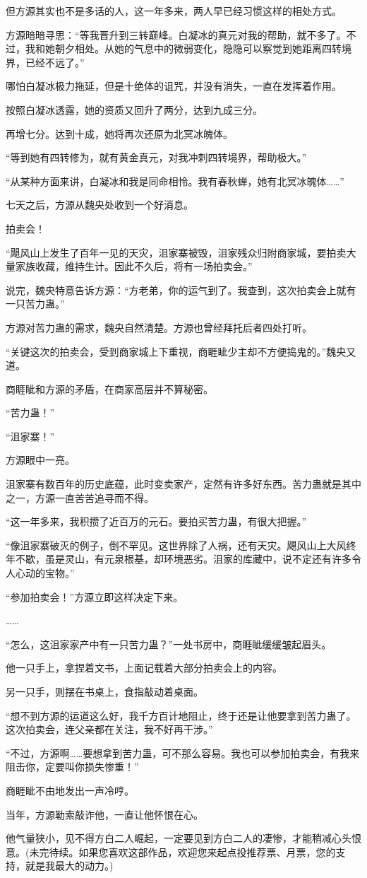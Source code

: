 \begin{this_body}
但方源其实也不是多话的人，这一年多来，两人早已经习惯这样的相处方式。

方源暗暗寻思：“等我晋升到三转巅峰。白凝冰的真元对我的帮助，就不多了。不过，我和她朝夕相处。从她的气息中的微弱变化，隐隐可以察觉到她距离四转境界，已经不远了。”

哪怕白凝冰极力拖延，但是十绝体的诅咒，并没有消失，一直在发挥着作用。

按照白凝冰透露，她的资质又回升了两分，达到九成三分。

再增七分。达到十成，她将再次还原为北冥冰魄体。

“等到她有四转修为，就有黄金真元，对我冲刺四转境界，帮助极大。”

“从某种方面来讲，白凝冰和我是同命相怜。我有春秋蝉，她有北冥冰魄体……”

七天之后，方源从魏央处收到一个好消息。

拍卖会！

“飓风山上发生了百年一见的天灾，沮家寨被毁，沮家残众归附商家城，要拍卖大量家族收藏，维持生计。因此不久后，将有一场拍卖会。”

说完，魏央特意告诉方源：“方老弟，你的运气到了。我查到，这次拍卖会上就有一只苦力蛊。”

方源对苦力蛊的需求，魏央自然清楚。方源也曾经拜托后者四处打听。

“关键这次的拍卖会，受到商家城上下重视，商睚眦少主却不方便捣鬼的。”魏央又道。

商睚眦和方源的矛盾，在商家高层并不算秘密。

“苦力蛊！”

“沮家寨！”

方源眼中一亮。

沮家寨有数百年的历史底蕴，此时变卖家产，定然有许多好东西。苦力蛊就是其中之一，方源一直苦苦追寻而不得。

“这一年多来，我积攒了近百万的元石。要拍买苦力蛊，有很大把握。”

“像沮家寨破灭的例子，倒不罕见。这世界除了人祸，还有天灾。飓风山上大风终年不歇，虽是灵山，有元泉根基，却环境恶劣。沮家的库藏中，说不定还有许多令人心动的宝物。”

“参加拍卖会！”方源立即这样决定下来。

……

“怎么，这沮家家产中有一只苦力蛊？”一处书房中，商睚眦缓缓皱起眉头。

他一只手上，拿捏着文书，上面记载着大部分拍卖会上的内容。

另一只手，则摆在书桌上，食指敲动着桌面。

“想不到方源的运道这么好，我千方百计地阻止，终于还是让他要拿到苦力蛊了。这次拍卖会，连父亲都在关注，我不好再干涉。”

“不过，方源啊……要想拿到苦力蛊，可不那么容易。我也可以参加拍卖会，有我来阻击你，定要叫你损失惨重！”

商睚眦不由地发出一声冷哼。

当年，方源勒索敲诈他，一直让他怀恨在心。

他气量狭小，见不得方白二人崛起，一定要见到方白二人的凄惨，才能稍减心头恨意。(未完待续。如果您喜欢这部作品，欢迎您来起点投推荐票、月票，您的支持，就是我最大的动力。)

\end{this_body}

